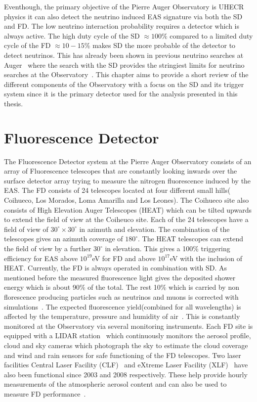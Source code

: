 Eventhough, the primary objective of the Pierre Auger Observatory is UHECR physics it can also detect the neutrino induced EAS signature via both the SD and FD. The low neutrino interaction probability requires a detector which is always active. The high duty cycle of the SD $\approx 100$\% compared to a limited duty cycle of the FD $\approx 10-15$\% makes SD the more probable of the detector to detect neutrinos. This has already been shown in previous neutrino searches at Auger~\cite{} where the search with the SD provides the stringiest limits for neutrino searches at the Observatory~\cite{}. This chapter aims to provide a short review of the different components of the Observatory with a focus on the SD and its trigger system since it is the primary detector used for the analysis presented in this thesis. 

\section*{Fluorescence Detector}
\label{sec:Fl_det}
The Fluorescence Detector system at the Pierre Auger Observatory consists of an array of Fluorescence telescopes that are constantly looking inwards over the surface detector array trying to measure the nitrogen fluorescence induced by the EAS. The FD consists of 24 telescopes located at four different small hills( Coihueco, Los Morados, Loma Amarilla and Los Leones). The Coihueco site also consists of High Elevation Auger Telescopes (HEAT) which can be tilted upwards to extend the field of view at the Coiheuco site. Each of the 24 telescopes have a field of view of $30^{\circ} \times 30^{\circ}$ in azimuth and elevation. The combination of the telescopes gives an azimuth coverage of $180^{\circ}$. The HEAT telescopes can extend the field of view by a further $30^{\circ}$ in elevation. This gives a 100\% triggering efficiency for EAS above $10^{19}$eV for FD and above $10^{17}$eV with the inclusion of HEAT. Currently, the FD is always operated in combination with SD. As mentioned before the measured fluorescence light gives the deposited shower energy which is about 90\% of the total. The rest 10\% which is carried by non florescence producing particles such as neutrinos and muons is corrected with simulations~\cite{}. The expected fluorescence yield(combined for all wavelengths) is affected by the temperature, pressure and humidity of air~\cite{}. This is constantly monitored at the Observatory via several monitoring instruments. Each FD site is equipped with a LIDAR station~\cite{} which continuously monitors the aerosol profile, cloud and sky cameras which photograph the sky to estimate the cloud coverage and wind and rain sensors for safe functioning of the FD telescopes. Two laser facilities Central Laser Facility (CLF)~\cite{} and eXtreme Laser Facility (XLF)~\cite{} have also been functional since 2003 and 2008 respectively. These help provide hourly measurements of the atmospheric aerosol content and can also be used to measure FD performance~\cite{}. 

